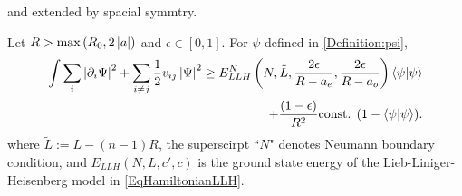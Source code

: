  and extended by spacial symmtry.
	\begin{lemma}\label{LemmaNormBoundEpsilonSpin1/2Fermi}
	Let $R>\max\left(R_0,2\left\lvert a \right\rvert\right) $ and $ \epsilon\in[0,1] $. For $ \psi $ defined in \eqref{Definition:psi},
	\begin{equation}
	\begin{aligned}
	\int \sum_{i}\left\lvert \partial_i\Psi \right\rvert^2+\sum_{i\neq j} \frac{1}{2}v_{ij}\left\lvert \Psi \right\rvert^2\geq E_{LLH}^N \left(N,\tilde{L},\frac{2\epsilon}{R-a_e},\frac{2\epsilon}{R-a_o}\right)\left\langle\psi|\psi\right\rangle\\+ \frac{(1-\epsilon)}{R^2}\textnormal{const. }(1-\left\langle\psi|\psi\right\rangle).
	\end{aligned}
	\end{equation}
	where $ \tilde{L}:=L-(n-1)R $, the superscirpt ``$ N $" denotes Neumann boundary condition, and $ E_{LLH}(N,L,c',c) $ is the ground state energy of the Lieb-Liniger-Heisenberg model in \eqref{EqHamiltonianLLH}.
\end{lemma}
